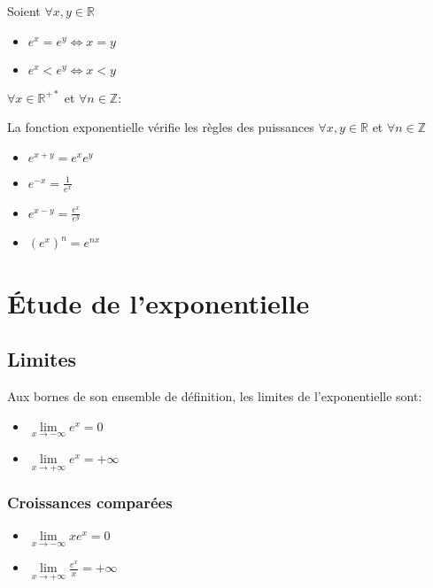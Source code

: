 \documentclass[a4paper]{article}
\begin{document}
{Soient $\forall x, y \in \mathbb{R}$}

\begin{multicols}{2}
	\begin{itemize}
  		\item{$e^x = e^y \Leftrightarrow x=y$}
  		\item{$e^x < e^y \Leftrightarrow x < y$}
	\end{itemize}
\end{multicols}
{$\forall x \in \mathbb{R}^{+*}$ et $\forall n \in \mathbb{Z}$:}

{La fonction exponentielle vérifie les règles des puissances}
{$\forall x,y \in \mathbb{R}$ et $\forall n \in \mathbb{Z}$}

\begin{multicols}{4}
	\begin{itemize}
		\item{$e^{x+y}=e^x e^y$}
		\item{$e^{-x}=\frac{1}{e^x}$}
		\item{$e^{x-y}=\frac{e^x}{e^y}$}
		\item{$(e^{x})^n=e^{nx}$}
	\end{itemize}
\end{multicols}

\section{Étude de l'exponentielle}
\subsection{Limites}

{Aux bornes de son ensemble de définition, les limites de l'exponentielle sont:}

\begin{multicols}{2}
	\begin{itemize}
  		\item{$\lim\limits_{x \rightarrow -\infty} e^x=0$}
  		\item{$\lim\limits_{x \rightarrow +\infty} e^x=+\infty$}
	\end{itemize}
\end{multicols}

\subsubsection{Croissances comparées}

\begin{multicols}{2}
	\begin{itemize}
  		\item{$\lim\limits_{x \rightarrow -\infty} xe^x=0$}
  		\item{$\lim\limits_{x \rightarrow +\infty} \frac{e^x}{x}=+\infty$}
	\end{itemize}
\end{multicols}
\end{document}
